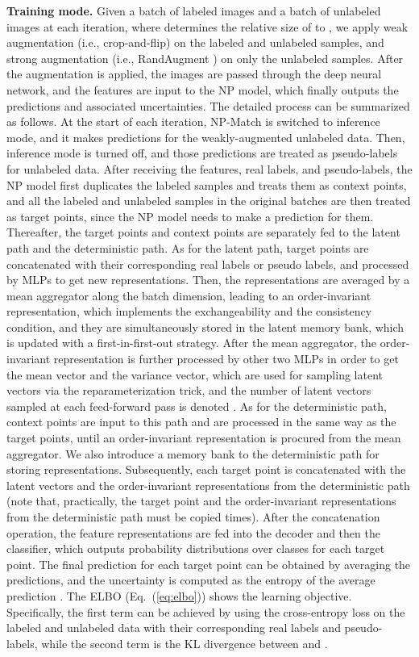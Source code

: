 \documentclass[nohyperref]{article}
\theoremstyle{plain}
\theoremstyle{definition}
\theoremstyle{remark}
\begin{document}
{\bf Training mode.} 
Given a batch of  labeled images   and a batch of unlabeled images  at each iteration, where  determines the relative size of  to , we apply weak augmentation (i.e., 
crop-and-flip) on the labeled and unlabeled samples, and strong augmentation (i.e.,  RandAugment \cite{cubuk2020randaugment}) on only the unlabeled samples. 
After the augmentation is applied, the images are passed through the deep neural network, 
and the features are input to the NP model, which finally outputs the predictions and associated uncertainties. The detailed process can be summarized as follows. 
At the start of each iteration, NP-Match is switched to inference mode, and it makes predictions for the weakly-augmented unlabeled data. 
Then, inference mode is turned off, and those predictions are treated as pseudo-labels for unlabeled data. 
After receiving the features, real labels, and pseudo-labels, the NP model first duplicates the labeled samples and treats them as context points, and all the labeled and unlabeled samples in the original batches are then treated as target points, since the NP model needs to make a prediction for them. Thereafter, the target points and context points are separately fed to the latent path and the deterministic path. As for the latent path, target points are concatenated with their corresponding real labels or pseudo labels, and processed by MLPs to get new representations. 
Then, the representations are averaged by a mean aggregator along the batch dimension, leading to an order-invariant representation, which implements the exchangeability  and the consistency condition, and they are simultaneously stored in the latent memory bank, which is updated with a first-in-first-out strategy. 
After the mean aggregator, the order-invariant representation is further processed by other two MLPs in order to get the mean vector and the variance vector, which are used for sampling latent vectors via the reparameterization trick, and the number of latent vectors sampled at each feed-forward pass is denoted . 
As for the deterministic path, context points are input to this path and are processed in the same way as the target points, until an order-invariant representation is procured from the mean aggregator. We also introduce a memory bank to the deterministic path for storing representations.
Subsequently, each target point is concatenated with the  latent vectors and the order-invariant
representations from the deterministic path (note that, practically, the target point and the order-invariant representations from the deterministic path must be copied  times). After the concatenation operation, the  feature representations are fed into the decoder  and then the classifier, which outputs  probability distributions over classes for each target point. The final prediction for each target point can be obtained by averaging the  predictions, and the uncertainty is computed as the entropy of the average prediction \cite{kendall2017uncertainties}. 
The ELBO (Eq.~(\ref{eq:elbo})) shows the learning objective.  Specifically, the first term can be achieved by using the cross-entropy loss on the labeled and unlabeled data with their corresponding real labels and pseudo-labels, while the second term is the KL divergence between  and .
\end{document}
